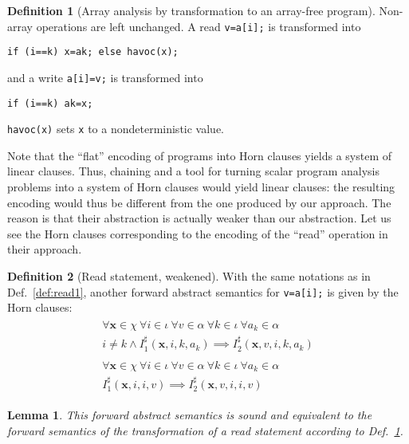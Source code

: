 \documentclass[a4paper]{article}
\newcommand{\ve}[1]{\mathbf{#1}}
\newcommand{\vx}{\ve{x}}
\newcommand{\abstr}[1]{#1^\sharp}
\theoremstyle{definition}
\newtheorem{definition}{Definition}
\theoremstyle{plain}
\newtheorem{lemma}[theorem]{Lemma}
\newcommand{\rulespacing}{\\[0.4em]}
\begin{document}
\begin{definition}[Array analysis by transformation to an array-free program]\label{def:weak1_transfo}
Non-array operations are left unchanged. A read \lstinline|v=a[i];| is transformed into
\begin{lstlisting}
if (i==k) x=ak; else havoc(x);
\end{lstlisting} and a write \lstinline|a[i]=v;| is transformed into
\begin{lstlisting}
if (i==k) ak=x;
\end{lstlisting}
\lstinline|havoc(x)| sets \lstinline|x| to a nondeterministic value.
\end{definition}

Note that the ``flat'' encoding of programs into Horn clauses yields a system of linear clauses. Thus, chaining \citet{Monniaux_Alberti_SAS2015} and a tool for turning scalar program analysis problems into a system of Horn clauses would yield linear clauses: the resulting encoding would thus be different from the one produced by our approach.
The reason is that their abstraction is actually weaker than our abstraction. Let us see the Horn clauses corresponding to the encoding of the ``read'' operation in their approach.

\begin{definition}[Read statement, weakened]\label{def:read1_weakened}
With the same notations as in Def.~\ref{def:read1}, another forward abstract semantics for  \lstinline|v=a[i];| is given by the Horn clauses:
\begin{align}
\begin{aligned}
\forall \vx \in \chi~ \forall i \in \iota~ \forall v \in \alpha~
  \forall k \in \iota~ \forall a_k \in \alpha\\
  i \neq k \land \abstr{I}_1(\vx,i,k,a_k) \implies
  \abstr{I}_2(\vx,v,i,k,a_k)
\end{aligned}\rulespacing
\begin{aligned}
\forall \vx \in \chi~ \forall i \in \iota~ \forall v \in \alpha~
  \forall k \in \iota~ \forall a_k \in \alpha\\
  \abstr{I}_1(\vx,i,i,v) \implies
  \abstr{I}_2(\vx,v,i,i,v)
\end{aligned}
\end{align}
\end{definition}

\begin{lemma}
This forward abstract semantics is sound and equivalent to the forward semantics of the transformation of a read statement according to Def.~\ref{def:weak1_transfo}.
\end{lemma}
\end{document}
